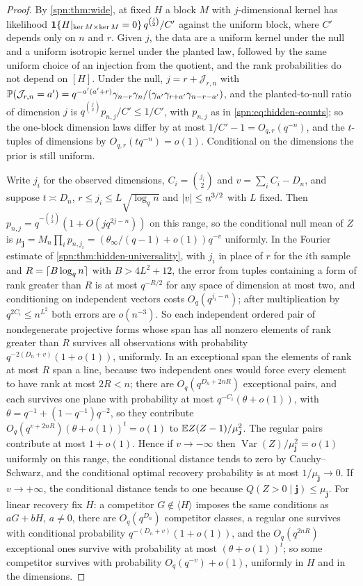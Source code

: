 \begin{proof}
By \cref{spn:thm:wide}, at fixed $H$ a block $M$ with $j$-dimensional kernel has likelihood
$\mathbf 1\{H|_{\ker M\times\ker M}=0\}\,q^{\binom j2}/C'$ against the uniform block, where $C'$ depends
only on $n$ and $r$. Given $j$, the data are a uniform kernel under the null and a uniform isotropic
kernel under the planted law, followed by the same uniform choice of an injection from the quotient, and
the rank probabilities do not depend on $[H]$. Under the null, $j=r+\mathcal J_{r,n}$ with
$\mathbb{P}(\mathcal J_{r,n}=a')=q^{-a'(a'+r)}\gamma_{n-r}\gamma_n/(\gamma_{a'}\gamma_{r+a'}\gamma_{n-r-a'})$,
and the planted-to-null ratio of dimension $j$ is $q^{\binom j2}p_{n,j}/C'\le1/C'$, with $p_{n,j}$ as in
\eqref{spn:eq:hidden-counts}; so the one-block dimension laws differ by at most $1/C'-1=O_{q,r}(q^{-n})$,
and the $t$-tuples of dimensions by $O_{q,r}(tq^{-n})=o(1)$. Conditional on the dimensions the prior is
still uniform.

Write $j_i$ for the observed dimensions, $C_i=\binom{j_i}2$ and $v=\sum_iC_i-D_n$, and suppose
$t\asymp D_n$, $r\le j_i\le L\sqrt{\log_qn}$ and $\lvert v\rvert\le n^{3/2}$ with $L$ fixed. Then
$p_{n,j}=q^{-\binom j2}(1+O(jq^{2j-n}))$ on this range, so the conditional null mean of $Z$ is
$\mu_{\boldsymbol j}=M_n\prod_ip_{n,j_i}=(\theta_\infty/(q-1)+o(1))q^{-v}$ uniformly. In the Fourier
estimate of \cref{spn:thm:hidden-universality}, with $j_i$ in place of $r$ for the $i$th sample and
$R=\lceil B\log_qn\rceil$ with $B>4L^2+12$, the error from tuples containing a form of rank greater than $R$
is at most $q^{-R/2}$ for any space of dimension at most two, and conditioning on independent vectors
costs $O_q(q^{j_i-n})$; after multiplication by $q^{2C_i}\le n^{L^2}$ both errors are $o(n^{-3})$. So
each independent ordered pair of nondegenerate projective forms whose span has all nonzero elements of
rank greater than $R$ survives all observations with probability $q^{-2(D_n+v)}(1+o(1))$, uniformly.
In an exceptional span the elements of rank at most $R$ span a line, because two independent ones would
force every element to have rank at most $2R<n$; there are $O_q(q^{D_n+2nR})$ exceptional pairs, and each
survives one plane with probability at most $q^{-C_i}(\theta+o(1))$, with $\theta=q^{-1}+(1-q^{-1})q^{-2}$,
so they contribute $O_q(q^{v+2nR})(\theta+o(1))^t=o(1)$ to $\mathbb{E} Z(Z-1)/\mu_{\boldsymbol j}^2$. The regular
pairs contribute at most $1+o(1)$. Hence if $v\to-\infty$ then $\operatorname{Var}(Z)/\mu_{\boldsymbol j}^2=o(1)$
uniformly on this range, the conditional distance tends to zero by Cauchy--Schwarz, and the conditional
optimal recovery probability is at most $1/\mu_{\boldsymbol j}\to0$. If $v\to+\infty$, the conditional
distance tends to one because $Q(Z>0\mid\boldsymbol j)\le\mu_{\boldsymbol j}$. For linear recovery fix
$H$: a competitor $G\notin\langle H\rangle$ imposes the same conditions as $aG+bH$, $a\ne0$, there are
$O_q(q^{D_n})$ competitor classes, a regular one survives with conditional probability
$q^{-(D_n+v)}(1+o(1))$, and the $O_q(q^{2nR})$ exceptional ones survive with probability at most
$(\theta+o(1))^t$; so some competitor survives with probability $O_q(q^{-v})+o(1)$, uniformly in $H$ and
in the dimensions.


\end{proof}
